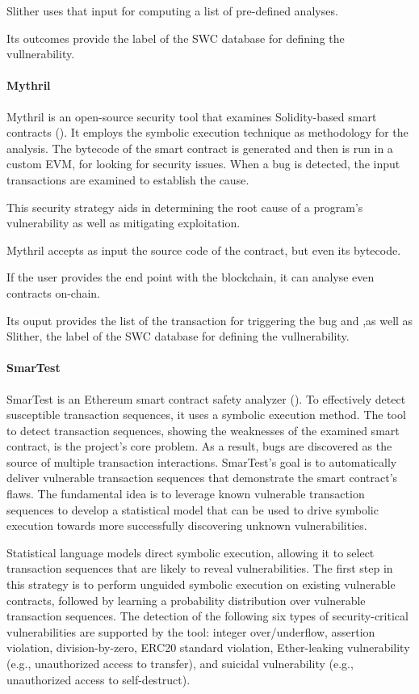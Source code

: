 \documentclass[a4paper,sigconf, language=french,
language=german, language=spanish, language=english]{acmart}
\begin{document}
Slither uses that input for computing a list of pre-defined analyses. 

Its outcomes provide the label of the SWC database for defining the vullnerability.
\paragraph{Mythril} 
Mythril is an open-source security tool that examines Solidity-based smart contracts (\cite{Mythril}).
It employs the symbolic execution technique as methodology for the analysis.
The bytecode of the smart contract is generated and then is run in a custom EVM, for looking for security issues.
When a bug is detected, the input transactions are examined to establish the cause. 

This security strategy aids in determining the root cause of a program's vulnerability as well as mitigating exploitation.

Mythril accepts as input the source code of the contract, but even its bytecode. 

If the user provides the end point with the blockchain, it can analyse even contracts on-chain.

Its ouput provides the list of the transaction for triggering the bug and ,as well as Slither,  the label of the SWC database for defining the vullnerability.

\paragraph{SmarTest}
SmarTest is an Ethereum smart contract safety analyzer (\cite{SmarTest}).
To effectively detect susceptible transaction sequences, it uses a symbolic execution method.
The tool to detect transaction sequences, showing the weaknesses of the examined smart contract, is the project's core problem.
As a result, bugs are discovered as the source of multiple transaction interactions.
SmarTest's goal is to automatically deliver vulnerable transaction sequences that demonstrate the smart contract's flaws. 
The fundamental idea is to leverage known vulnerable transaction sequences to develop a statistical model that can be used to drive symbolic execution 
towards more successfully discovering unknown vulnerabilities.

Statistical language models direct symbolic execution, allowing it to select transaction sequences that are likely to reveal vulnerabilities.
The first step in this strategy is to perform unguided symbolic execution on existing vulnerable contracts, followed by learning a probability 
distribution over vulnerable transaction sequences. The detection of the following six types of security-critical vulnerabilities are supported
by the tool: integer over/underflow, assertion violation, division-by-zero, ERC20 standard
violation, Ether-leaking vulnerability (e.g., unauthorized access to transfer), and suicidal
vulnerability (e.g., unauthorized access to self-destruct). 
\end{document}
